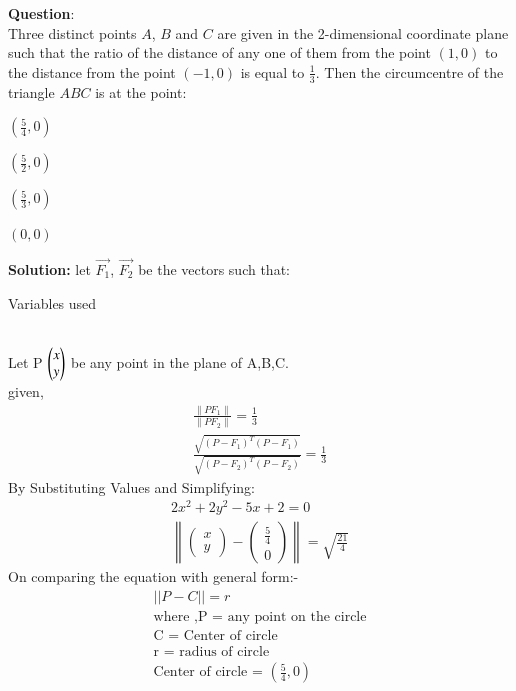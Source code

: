 \documentclass[journal]{IEEEtran}
\begin{document}
\textbf{Question}:\\
Three distinct points $A$, $B$ and $C$ are given in the 2-dimensional coordinate plane such that the ratio of the distance of any one of them from the point $(1,0)$ to the distance from the point $(-1,0)$ is equal to $\frac{1}{3}$. Then the circumcentre of the triangle $ABC$ is at the point:
\begin{enumerate}
\begin{multicols}{4}
\item $\left(\frac{5}{4}, 0\right)$
\item $\left(\frac{5}{2}, 0\right)$
\item $\left(\frac{5}{3}, 0\right)$
\item $(0, 0)$
\end{multicols}
\end{enumerate}
\textbf{Solution:}
let $\vec{F_1}$, $\vec{F_2}$ be the vectors such that:
\begin{table}[h!]
    \centering
    
    \caption{Variables used}
    \label{table 1.9.1}
\end{table}\\
  Let P $\begin{pmatrix}x\\y\end{pmatrix}$ be any point in the plane of A,B,C.\\
  given,
\begin{align}
\frac{\| PF_1 \|}{\| PF_2 \|} = \frac{1}{3}\\
\frac{\sqrt{(P-F_1)^T (P-F_1)}}{\sqrt{(P-F_2)^T (P-F_2)}} = \frac{1}{3}
\end{align}
By Substituting Values and Simplifying:
\begin{align}
2x^2 + 2y^2 - 5x + 2 = 0\\
\left\lVert
\begin{pmatrix} x \\ y \end{pmatrix}
-
\begin{pmatrix} \tfrac{5}{4} \\ 0 \end{pmatrix}
\right\lVert
= \sqrt{\tfrac{21}{4}}
\end{align}
On comparing the equation with general form:-
\begin{align}
||P - C|| = r\\
\text{
where ,}
\text{
P = any point on the circle}\\
\text{C = Center of circle}\\
\text{
r = radius of circle}\\
\text{
Center of circle =  } (\frac{5}{4}, 0)
\end{align}
\end{document}
